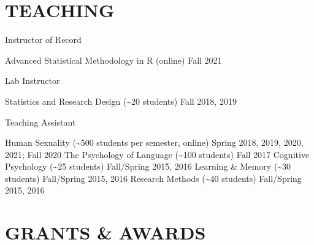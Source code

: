 \documentclass[10pt,]{article}
\begin{document}
\hypertarget{teaching}{%
\section{TEACHING}\label{teaching}}

\textcolor{light-gray}{Instructor of Record}

Advanced Statistical Methodology in R (online)
\hfill \textcolor{light-gray}{Fall 2021}

\textcolor{light-gray}{Lab Instructor}

Statistics and Research Design (\textasciitilde20 students)
\hfill \textcolor{light-gray}{Fall 2018, 2019}

\textcolor{light-gray}{Teaching Assistant}

Human Sexuality (\textasciitilde500 students per semester, online)
\hfill \textcolor{light-gray}{Spring 2018, 2019, 2020, 2021; Fall 2020}
\newline The Psychology of Language (\textasciitilde100 students)
\hfill \textcolor{light-gray}{Fall 2017} \newline Cognitive Psychology
(\textasciitilde25 students)
\hfill \textcolor{light-gray}{Fall/Spring 2015, 2016} \newline Learning
\& Memory (\textasciitilde30 students)
\hfill \textcolor{light-gray}{Fall/Spring 2015, 2016} \newline Research
Methods (\textasciitilde40 students)
\hfill \textcolor{light-gray}{Fall/Spring 2015, 2016}

\hypertarget{grants-awards}{%
\section{GRANTS \& AWARDS}\label{grants-awards}}
\end{document}
